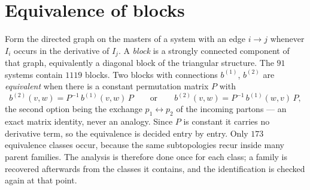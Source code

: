 \documentclass[11pt]{article}
\begin{document}
\section{Equivalence of blocks}
Form the directed graph on the masters of a system with an edge
$i \to j$ whenever $I_i$ occurs in the derivative of $I_j$.  A
\emph{block} is a strongly connected component of that graph,
equivalently a diagonal block of the triangular structure.  The $91$
systems contain $1119$ blocks.  Two blocks with connections
$b^{(1)}$, $b^{(2)}$ are
\emph{equivalent} when there is a constant permutation matrix $P$
with
\begin{equation}
  b^{(2)}(v,w) = P^{-1}\, b^{(1)}(v,w)\, P
  \qquad\text{or}\qquad
  b^{(2)}(v,w) = P^{-1}\, b^{(1)}(w,v)\, P ,
\end{equation}
the second option being the exchange $p_1 \leftrightarrow p_2$ of the
incoming partons --- an exact matrix identity, never an analogy.
Since $P$ is constant it carries no derivative term, so the
equivalence is decided entry by entry.  Only $173$ equivalence
classes occur, because the same subtopologies recur inside many
parent families.
The analysis is therefore done once for each class; a family is
recovered afterwards from the classes it contains, and the
identification is checked again at that point.
\end{document}
